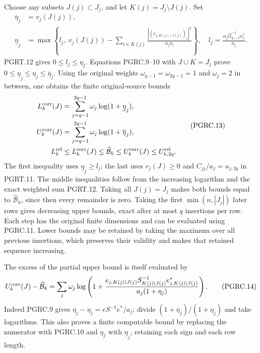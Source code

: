 Choose any subsets $J(j)\subset J_j$, and let
$K(j)=J_j\setminus J(j)$. Set
\[
 \begin{aligned}
 \overline\eta_j&=v_j(J(j)),\\
 \underline\eta_j
 &=\max\left\{l_j,\ v_j(J(j))-
       \sum_{i\in K(j)}
       \frac{|(e_{j,K(j)\mid J(j)})_i|^2}{a_ja_i}\right\},
 \quad l_j=\frac{\alpha_j\widehat G_{q-1}^{-1}\alpha_j^*}{a_j}.
 \end{aligned}
 \tag{PGRC.12}\label{eq:pgrc-row-enclosure}
\]
PGRT.12 gives $0\leq l_j\leq\eta_j$. Equations PGRC.9--10
with $J\cup K=J_j$ prove
$0\leq\underline\eta_j\leq\eta_j\leq\overline\eta_j$.
Using the original weights
$\omega_{q-1}=\omega_{2q-1}=1$ and $\omega_j=2$ in between,
one obtains the finite original-source bounds
\[
 \begin{aligned}
 L_k^{\rm corr}(J)&=\sum_{j=q-1}^{2q-1}
                         \omega_j\log(1+\underline\eta_j),\\
 U_k^{\rm corr}(J)&=\sum_{j=q-1}^{2q-1}
                         \omega_j\log(1+\overline\eta_j),\\
 L_k^{\rm rel}&\leq L_k^{\rm corr}(J)
 \leq\widehat{\mathcal B}_k\leq U_k^{\rm corr}(J)
 \leq U_{k,2q}^{\rm rel}.
 \end{aligned}
 \tag{PGRC.13}\label{eq:pgrc-volume-enclosure}
\]
The first inequality uses $\underline\eta_j\geq l_j$;
the last uses $r_j(J)\geq0$ and
$C_{jj}/a_j=u_{j,2q}$ in PGRT.11. The middle inequalities
follow from the increasing logarithm and the exact weighted sum
PGRT.12. Taking all $J(j)=J_j$ makes both bounds equal to
$\widehat{\mathcal B}_k$, since then every remainder is zero.
Taking the first $\min(n,|J_j|)$ later rows gives decreasing
upper bounds, exact after at most $q$ insertions per row. Each
step has the original finite dimensions and can be evaluated
using PGRC.11. Lower bounds may be retained by taking the
maximum over all previous insertions, which preserves their
validity and makes that retained sequence increasing.

The excess of the partial upper bound is itself evaluated by
\[
 U_k^{\rm corr}(J)-\widehat{\mathcal B}_k
 =\sum_j\omega_j\log\left(1+
 \frac{e_{j,K(j)\mid J(j)}S_{K(j)\mid J(j)}^{-1}
                 e_{j,K(j)\mid J(j)}^*}
 {a_j(1+\eta_j)}\right).
 \tag{PGRC.14}\label{eq:pgrc-volume-error}
\]
Indeed PGRC.9 gives
$\overline\eta_j-\eta_j=eS^{-1}e^*/a_j$; divide
$(1+\overline\eta_j)/(1+\eta_j)$ and take logarithms.
This also proves a finite computable bound by replacing the
numerator with PGRC.10 and $\eta_j$ with
$\underline\eta_j$, retaining each sign and each row length.


